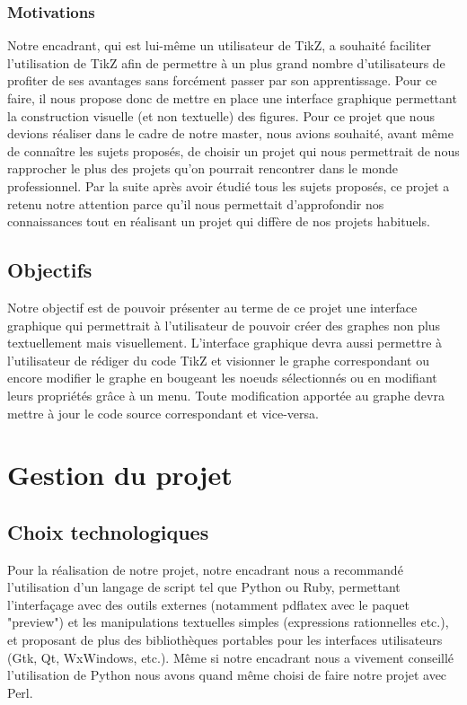 \documentclass[a4paper]{report}
\begin{document}
  \subsection{Motivations}
  Notre encadrant, qui est lui-même un utilisateur de TikZ, a souhaité faciliter l'utilisation de TikZ afin de permettre à un plus grand nombre d'utilisateurs de profiter de ses avantages sans forcément passer par son apprentissage. Pour ce faire, il nous propose donc de mettre en place une interface graphique permettant la construction  visuelle (et non textuelle) des figures.
  \newline
  Pour ce projet que nous devions réaliser dans le cadre de notre master, nous avions souhaité, avant même de 
connaître les sujets proposés, de choisir un projet qui nous permettrait de nous rapprocher le plus des projets qu'on pourrait rencontrer dans le monde professionnel. Par la suite après avoir étudié tous les sujets proposés, ce projet a retenu notre attention parce qu'il nous permettait d'approfondir nos connaissances tout en réalisant un projet qui diffère de nos projets habituels.
  \section{Objectifs}
  Notre objectif est de pouvoir présenter au terme de ce projet une interface graphique qui permettrait à l'utilisateur de pouvoir créer des graphes non plus textuellement mais visuellement. L'interface graphique devra aussi permettre à l'utilisateur de rédiger du code TikZ et visionner le graphe correspondant ou encore modifier le graphe en bougeant les noeuds sélectionnés ou en modifiant leurs propriétés grâce à un menu.
Toute modification apportée au graphe devra mettre à jour le code source correspondant et vice-versa. 
  \chapter {Gestion du projet}
  \section{Choix technologiques}
  Pour la réalisation de notre projet, notre encadrant nous a recommandé l'utilisation d'un langage de script tel que Python ou Ruby, permettant l'interfaçage avec des outils externes (notamment pdflatex avec le paquet "preview") et les manipulations textuelles simples (expressions rationnelles etc.), et proposant de plus des bibliothèques portables pour les interfaces utilisateurs (Gtk, Qt, WxWindows, etc.). Même si notre encadrant nous a vivement conseillé l'utilisation de Python nous avons quand même choisi de faire notre projet avec Perl. 
\end{document}
